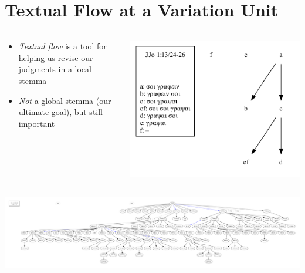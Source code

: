 \documentclass[10pt]{beamer}
\begin{document}
	\section*{Textual Flow at a Variation Unit}
	\begin{frame}
		\begin{columns}
			\begin{column}{0.45\textwidth}
				\begin{itemize}
					\item \emph{Textual flow} is a tool for helping us revise our judgments in a local stemma
					\item \emph{Not} a global stemma (our ultimate goal), but still important
				\end{itemize}
			\end{column}
			\begin{column}{0.45\textwidth}
				\begin{center}
					\includegraphics[width=\textwidth]{../img/B25K1V13U24-26-local-stemma-incomplete.pdf}
				\end{center}
			\end{column}
		\end{columns}
		\begin{center}
			\includegraphics[width=\textwidth]{../img/B25K1V13U24-26-textual-flow.pdf}
		\end{center}
	\end{frame}
\end{document}
